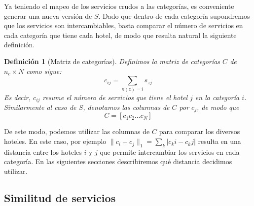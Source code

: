 \documentclass[12pt]{report}
\newtheorem{defn}{Definici\'on}[chapter]
\begin{document}
Ya teniendo el mapeo de los servicios crudos a las categorías, es conveniente generar una nueva versión de $S$. Dado que dentro de cada categoría supondremos que los servicios son intercambiables, basta comparar el número de servicios en cada categoría que tiene cada hotel, de modo que resulta natural la siguiente definición.
\begin{defn}[Matriz de categorías]
Definimos la matriz de categorías $C$ de $n_c \times N$ como sigue:
\[
c_{ij} = \sum_{\kappa(z) = i} s_{zj}
\]
Es decir, $c_{ij}$ resume el número de servicios que tiene el hotel $j$ en la categoría $i$. Similarmente al caso de $S$, denotamos las columnas de $C$ por $c_j$, de modo que
\[
C = [c_1 c_2 \dots c_N]
\]
\end{defn}
De este modo, podemos utilizar las columnas de $C$ para comparar los diversos hoteles. En este caso, por ejemplo $\|c_i - c_j\|_1 = \sum_k |c_ki - c_kj|$ resulta en una distancia entre los hoteles $i$ y $j$ que permite intercambiar los servicios en cada categoría. En las siguientes secciones describiremos qué distancia decidimos utilizar.

\subsection*{Similitud de servicios}
\end{document}
